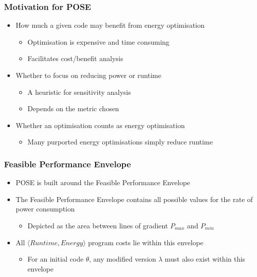 \documentclass{beamer}
\begin{document}
  \begin{frame}
    \frametitle{Motivation for POSE}
    \begin{itemize}
      \item{How much a given code may benefit from energy optimisation}
      \begin{itemize}
        \item{Optimisation is expensive and time consuming}
        \item{Facilitates cost/benefit analysis}
      \end{itemize}
      \item{Whether to focus on reducing power or runtime}
      \begin{itemize}
        \item{A heuristic for sensitivity analysis}
        \item{Depends on the metric chosen}
      \end{itemize}
      \item{Whether an optimisation counts as energy optimisation}
      \begin{itemize}
        \item{Many purported energy optimisations simply reduce runtime}
      \end{itemize}
    \end{itemize}
   \end{frame}

  \begin{frame}
    \frametitle{Feasible Performance Envelope}
    \begin{itemize}
      \item POSE is built around the Feasible Performance Envelope
      \item The Feasible Performance Envelope contains all possible values for the rate of power consumption 
      \begin{itemize}
      \item Depicted as the area between lines of gradient $P_{max}$ and $P_{min}$
      \end{itemize}
      \item All $\langle Runtime, Energy \rangle$ program costs lie within this envelope
      \begin{itemize}
        \item For an initial code $\theta$, any modified version $\lambda$ must also exist within this envelope
      \end{itemize}
    \end{itemize}
  \end{frame}
\end{document}
